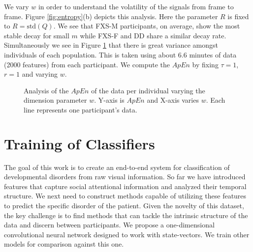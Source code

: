 \documentclass[10pt,twocolumn,letterpaper]{article}
\begin{document}
We vary $w$ in order to understand the volatility of the signals from frame to frame. Figure \ref{fig:entropy}(b) depicts this analysis. Here the parameter $R$ is fixed to $R=\text{std}(Q)$. We see that FXS-M participants, on average, show the most stable decay for small $m$ while FXS-F and DD share a similar decay rate. Simultaneously we see in Figure \ref{fig:individual_entropy} that there is great variance amongst individuals of each population. This is taken using about 6.6 minutes of data (2000 features) from each participant. We compute the $ApEn$ by fixing $\tau=1$, $r=1$ and varying $w$. 
\begin{figure}[b]
        \centering
            \hfill
             \hfill
         \centering
        \caption{Analysis of the $ApEn$ of the data per individual varying the dimension parameter $w$. Y-axis is $ApEn$ and X-axis varies $w$. Each line represents one participant's data.}
        \label{fig:individual_entropy}
\end{figure}


\section{Training of Classifiers}
\label{sec:classification}

The goal of this work is to create an end-to-end system for classification of developmental disorders from raw visual information. So far we have introduced features that capture social attentional information and analyzed their temporal structure. We next need to construct methods capable of utilizing these features to predict the specific disorder of the patient. Given the novelty of this dataset, the key challenge is to find methods that can tackle the intrinsic structure of the data and discern between participants. We propose a one-dimensional convolutional neural network designed to work with state-vectors. We train other models for comparison against this one.
\end{document}
